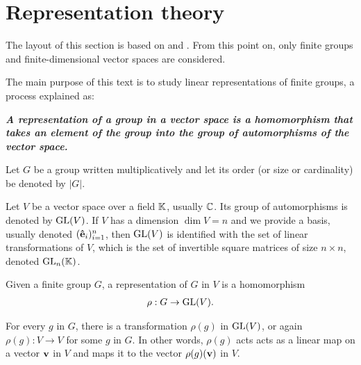 \clearpage{\thispagestyle{empty}}
\section{Representation theory}

	
	The layout of this section is based on \cite{Serre} and \cite{FultonHarris}. From this point on, only finite groups and finite-dimensional vector spaces are considered. 
	
	The main purpose of this text is to study linear representations of finite groups, a process explained as:
	
	\textbf{\emph{A representation of a group in a vector space is a homomorphism that takes an element of the group into the group of automorphisms of the vector space.}}
	
	Let $G$ be a group written multiplicatively and let its order (or size or cardinality) be denoted by $|G|$. 
	
	Let $V$ be a vector space over a field $\mathbb{K}$, usually $\mathbb{C}$. Its group of automorphisms is denoted by $\text{GL}(V)$. If $V$ has a dimension $\dim V = n$ and we provide a basis, usually denoted $(\mathbf{\hat{e}}_i)_{i=1}^n$, then $\text{GL}(V)$ is identified with the set of linear transformations of $V$, which is the set of invertible square matrices of size $n \times n$, denoted $\text{GL}_n(\mathbb{K})$\cite[18.1]{DummitFoote}.
	
	\begin{definition}[Representation]
		Given a finite group $G$, a representation of $G$ in $V$ is a homomorphism
		\begin{align}
			\rho: G \rightarrow \text{GL}(V).
		\end{align}
	\end{definition}
	For every $g$ in $G$, there is a transformation $\rho(g)$ in $\text{GL}(V)$, or again $\rho(g): V \rightarrow V$ for some $g$ in $G$. In other words, $\rho(g)$ acts acts as a linear map on a vector $\mathbf{v}$ in $V$ and maps it to the vector $\rho(g)(\mathbf{v})$ in $V$.
	

